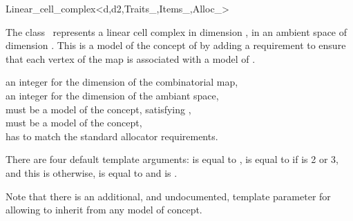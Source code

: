 \ccRefPageBegin
\begin{ccRefClass}{Linear_cell_complex<d,d2,Traits_,Items_,Alloc_>}


\ccDefinition
  
The class \ccRefName\ represents a linear cell complex in dimension ,
in an ambient space of dimension . This is a model of the concept of
 by adding a requirement to ensure that
each vertex of the map is associated with a
model of .


\ccIsModel

\ccInheritsFrom
{}

\ccParameters
{} an integer for the dimension of the combinatorial map,\\
 an integer for the dimension of the ambiant space,\\
 must be a model of the  concept, satisfying ,\\
 must be a model of the  concept,\\
 has to match the standard allocator requirements. 

There are four default template arguments:
 is equal to ,
 is equal to  if
 is 2 or 3, and this is  otherwise,
 is equal to  and
 is .

\begin{ccAdvanced}
  Note that there is an additional, and undocumented, template
  parameter  for
   allowing
  to inherit from any model of  concept.
\end{ccAdvanced}


\end{ccRefClass}
